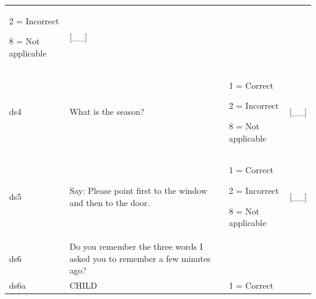 \documentclass[12pt,a4paper]{book}
\theoremstyle{definition}
\theoremstyle{definition}
\theoremstyle{definition}
\theoremstyle{remark}
\begin{document}
\begin{longtable}[]{@{}llll@{}}
\begin{minipage}[t]{0.24\columnwidth}
2 = Incorrect

8 = Not applicable\strut
\end{minipage} & \begin{minipage}[t]{0.24\columnwidth}\raggedright
{[}\_\_{]}\strut
\end{minipage}\tabularnewline
\begin{minipage}[t]{0.24\columnwidth}\raggedright
ds4\strut
\end{minipage} & \begin{minipage}[t]{0.24\columnwidth}\raggedright
What is the season?\strut
\end{minipage} & \begin{minipage}[t]{0.24\columnwidth}\raggedright
1 = Correct

2 = Incorrect

8 = Not applicable\strut
\end{minipage} & \begin{minipage}[t]{0.24\columnwidth}\raggedright
{[}\_\_{]}\strut
\end{minipage}\tabularnewline
\begin{minipage}[t]{0.24\columnwidth}\raggedright
ds5\strut
\end{minipage} & \begin{minipage}[t]{0.24\columnwidth}\raggedright
Say: Please point first to the window and then to the door.\strut
\end{minipage} & \begin{minipage}[t]{0.24\columnwidth}\raggedright
1 = Correct

2 = Incorrect

8 = Not applicable\strut
\end{minipage} & \begin{minipage}[t]{0.24\columnwidth}\raggedright
{[}\_\_{]}\strut
\end{minipage}\tabularnewline
\begin{minipage}[t]{0.09\columnwidth}\raggedright
ds6\strut
\end{minipage} & \begin{minipage}[t]{0.41\columnwidth}\raggedright
Do you remember the three words I asked you to remember a few minutes
ago?\strut
\end{minipage} & \begin{minipage}[t]{0.25\columnwidth}\raggedright
\strut
\end{minipage} & \begin{minipage}[t]{0.13\columnwidth}\raggedright
\strut
\end{minipage}\tabularnewline
\begin{minipage}[t]{0.24\columnwidth}\raggedright
ds6a\strut
\end{minipage} & \begin{minipage}[t]{0.24\columnwidth}\raggedright
CHILD\strut
\end{minipage} & \begin{minipage}[t]{0.24\columnwidth}\raggedright
1 = Correct


\end{minipage}
\end{longtable}
\end{document}
